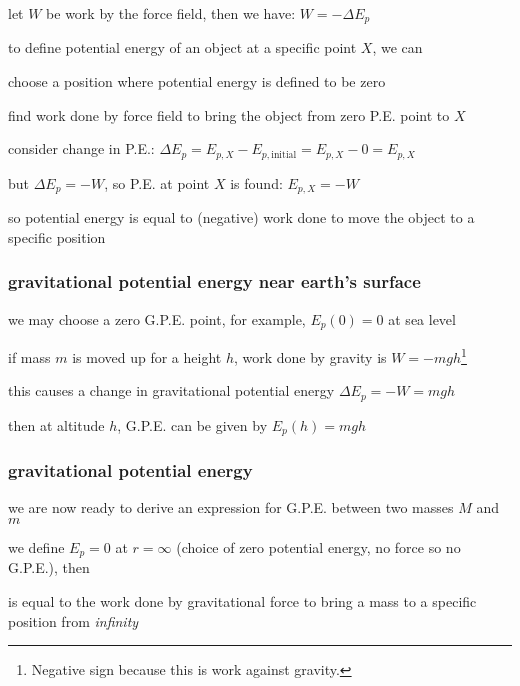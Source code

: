 let $W$ be work by the force field, then we have: $\boxed{W=-\Delta E_p}$

\newpage

to define potential energy of an object at a specific point $X$, we can

\begin{compactenum}
	\item[(1)] choose a position where potential energy is defined to be zero
	
	\item[(2)] find work done by force field to bring the object from zero P.E. point to $X$
	
	\item[(3)] consider change in P.E.: $\Delta E_p = E_{p,X} - E_{p,\text{initial}} = E_{p,X} - 0 = E_{p,X}$
	
	but $\Delta E_p = -W$, so P.E. at point $X$ is found: $E_{p,X} = -W$
	
\end{compactenum}

so potential energy is equal to (negative) work done to move the object to a specific position

\subsubsection*{gravitational potential energy near earth's surface}

we may choose a zero G.P.E. point, for example, $E_p(0) = 0$ at sea level

if mass $m$ is moved up for a height $h$, work done by gravity is $W=-mgh$\footnote{Negative sign because this is work against gravity.}

this causes a change in gravitational potential energy $\Delta E_p=-W=mg h$

then at altitude $h$, G.P.E. can be given by $E_p(h)=mgh$

\subsubsection{gravitational potential energy}


we are now ready to derive an expression for G.P.E. between two masses $M$ and $m$

we define $E_p=0$ at $r=\infty$ (choice of zero potential energy, no force so no G.P.E.), then

\begin{ilight}
	 is equal to the work done by gravitational force to bring a mass to a specific position from \emph{infinity}
\end{ilight} 

